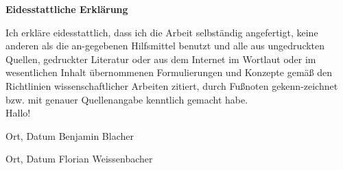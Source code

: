 \textbf{\Large Eidesstattliche Erklärung}

Ich erkläre eidesstattlich, dass ich die Arbeit selbständig angefertigt, keine anderen als die an-gegebenen Hilfsmittel benutzt und alle aus ungedruckten Quellen, gedruckter Literatur oder aus dem Internet im Wortlaut oder im wesentlichen Inhalt übernommenen Formulierungen und Konzepte gemäß den Richtlinien wissenschaftlicher Arbeiten zitiert, durch Fußnoten gekenn-zeichnet bzw. mit genauer Quellenangabe kenntlich gemacht habe.  \\
Hallo!

\vspace{2cm}
\hspace{2cm}\hrulefill{}\hspace{2.35cm}\hrulefill{}\hspace{1cm}

\hspace{2cm} Ort, Datum \hspace{5cm} Benjamin Blacher \hfill

\vspace{2cm}
\hspace{2cm}\hrulefill{}\hspace{2.35cm}\hrulefill{}\hspace{1cm}

\hspace{2cm} Ort, Datum \hspace{5cm} Florian Weissenbacher \hfill